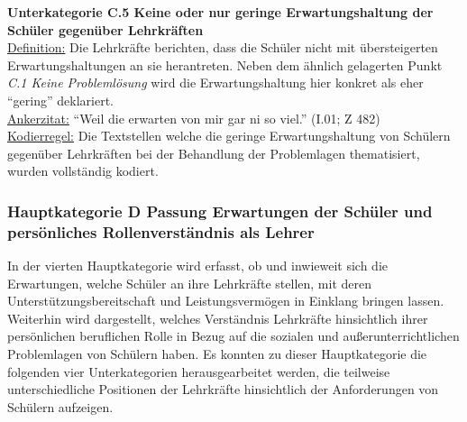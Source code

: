 \noindent
\textbf{Unterkategorie C.5 Keine oder nur geringe Erwartungshaltung der Schüler gegenüber Lehrkräften}\\
\underline{Definition:} Die Lehrkräfte berichten, dass die Schüler nicht mit übersteigerten Erwartungshaltungen an sie herantreten. Neben dem ähnlich gelagerten Punkt \textit{C.1 Keine Problemlösung} wird die Erwartungshaltung hier konkret als eher "`gering"' deklariert.\\
\underline{Ankerzitat:} "`Weil die erwarten von mir gar ni so viel."' (I.01; Z 482)\\
\underline{Kodierregel:} Die Textstellen welche die geringe Erwartungshaltung von Schülern gegenüber Lehrkräften bei der Behandlung der Problemlagen thematisiert, wurden vollständig kodiert.

\subsubsection{Hauptkategorie D Passung Erwartungen der Schüler und persönliches Rollenverständnis als Lehrer }
\label{sec:HauptkategorieDPassungErwartungenDerSchülerUndPersönlichesRollenverständnisAlsLehrer}

In der vierten Hauptkategorie wird erfasst, ob und inwieweit sich die Erwartungen, welche Schüler an ihre Lehrkräfte stellen, mit deren Unterstützungsbereitschaft und Leistungsvermögen in Einklang bringen lassen. Weiterhin wird dargestellt, welches Verständnis Lehrkräfte hinsichtlich ihrer persönlichen beruflichen Rolle in Bezug auf die sozialen und außerunterrichtlichen Problemlagen von Schülern haben. Es konnten zu dieser Hauptkategorie die folgenden vier Unterkategorien herausgearbeitet werden, die teilweise unterschiedliche Positionen der Lehrkräfte hinsichtlich der Anforderungen von Schülern aufzeigen.\\

